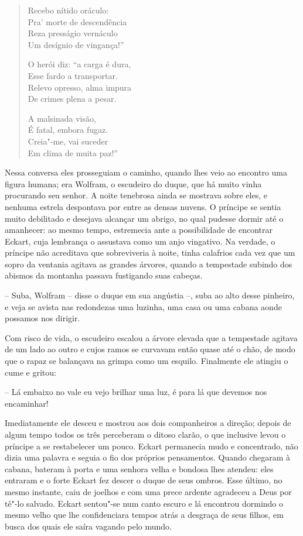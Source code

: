 \begin{verse}
Recebo nítido oráculo:\\
Pra' morte de descendência\\
Reza presságio vernáculo\\
Um desígnio de vingança!''

O herói diz: ``a carga é dura,\\
Esse fardo a transportar.\\
Relevo opresso, alma impura\\
De crimes plena a pesar.

A malsinada visão,\\
É fatal, embora fugaz.\\
Creia"-me, vai suceder\\
Em clima de muita paz!''
\end{verse}

 Nessa conversa eles prosseguiam o caminho, quando lhes veio ao encontro
uma figura humana; era Wolfram, o escudeiro do duque, que há muito
vinha procurando seu senhor. A noite tenebrosa ainda se mostrava sobre
eles, e nenhuma estrela despontava por entre as densas nuvens. O
príncipe se sentia muito debilitado e desejava alcançar um abrigo, no
qual pudesse dormir até o amanhecer: ao mesmo tempo, estremecia ante a
possibilidade de encontrar Eckart, cuja lembrança o assustava como um anjo 
vingativo. Na verdade, o príncipe não acreditava que sobreviveria à
noite, tinha calafrios cada vez que um sopro da ventania agitava as
grandes árvores, quando a tempestade subindo dos abismos da montanha
passava fustigando suas cabeças.

  -- Suba, Wolfram -- disse o duque em sua angústia --, suba ao alto desse
pinheiro, e veja se avista nas redondezas uma luzinha, uma casa ou uma
cabana aonde possamos nos dirigir.

 Com risco de vida, o escudeiro escalou a árvore elevada que a
tempestade agitava de um lado ao outro e cujos ramos se curvavam então
quase até o chão, de modo que o rapaz se balançava na grimpa como um
esquilo. Finalmente ele atingiu o cume e gritou:

 -- Lá embaixo no vale eu vejo brilhar uma luz, é para lá que devemos nos
encaminhar!

Imediatamente ele desceu e mostrou aos dois companheiros a direção;
depois de algum tempo todos os três perceberam o ditoso clarão, o que
inclusive levou o príncipe a se restabelecer um pouco. Eckart permanecia
mudo e concentrado, não dizia uma palavra e seguia o fio dos próprios
pensamentos. Quando chegaram à cabana, bateram à porta e uma senhora
velha e bondosa lhes atendeu: eles entraram e o forte Eckart fez descer
o duque de seus ombros. Esse último, no mesmo instante, caiu de joelhos
e com uma prece ardente agradeceu a Deus por tê"-lo salvado. Eckart
sentou"-se num canto escuro e lá encontrou dormindo o mesmo velho que
lhe confidenciara tempos atrás a desgraça de seus filhos, em busca
dos quais ele saíra vagando pelo mundo.

